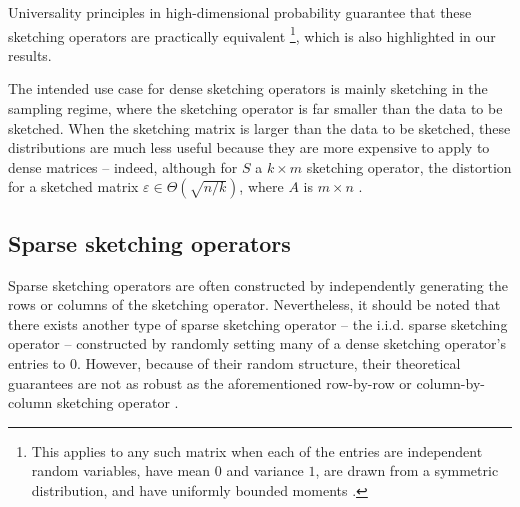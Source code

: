 \documentclass{article}
\begin{document}
Universality principles in high-dimensional probability \cite{oymak2018universality} guarantee that these sketching operators are practically equivalent \footnote{This applies to any such matrix when each of the entries are independent random variables, have mean $0$ and variance $1$, are drawn from a symmetric distribution, and have uniformly bounded moments \cite{oymak2018universality}.}, which is also highlighted in our results. 





The intended use case for dense sketching operators is mainly sketching in the sampling regime, where the sketching operator is far smaller than the data to be sketched. When the sketching matrix is larger than the data to be sketched, these distributions are much less useful because they are more expensive to apply to dense matrices\cite{murray2023randomizednumericallinearalgebra} -- indeed, although for $S$ a $k \times m$ sketching operator, the distortion for a sketched matrix $\varepsilon \in \Theta(\sqrt{ n/k})$, where $A$ is $m \times n$ \cite{magdonismail2019fastfixeddimensionl2subspace}.


\subsection{Sparse sketching operators}
Sparse sketching operators are often constructed by independently generating the rows or columns of the sketching operator. Nevertheless, it should be noted that there exists another type of sparse sketching operator -- the i.i.d. sparse sketching operator -- constructed by randomly setting many of a dense sketching operator's entries to $0$. However, because of their random structure, their theoretical guarantees are not as robust as the aforementioned row-by-row or column-by-column sketching operator \cite{murray2023randomizednumericallinearalgebra}.
\end{document}
